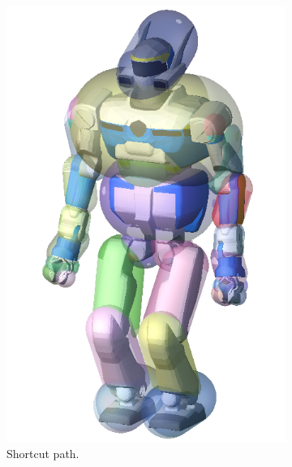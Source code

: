 \begin{figure}
\begin{subfigure}{0.48\columnwidth}
    \includegraphics[width = \columnwidth]
                    {src/chap3-optimal-motion-planning/figure/hrp2-bounding-capsule.png}
    \caption{Shortcut path.}
    \label{simple-FIXMEa}
  \end{subfigure}
  \begin{subfigure}{0.48\columnwidth}
    \centering

\end{subfigure}
\end{figure}
